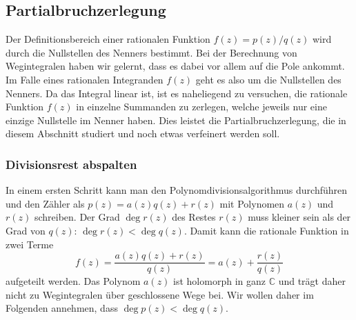 %
%
%
\subsection{Partialbruchzerlegung
\label{buch:ratint:bernoulli:subsection:partialbruch}}
Der Definitionsbereich einer rationalen Funktion $f(z)=p(z)/q(z)$
wird durch die Nullstellen des Nenners bestimmt.
Bei der Berechnung von Wegintegralen haben wir gelernt, dass es
dabei vor allem auf die Pole ankommt.
Im Falle eines rationalen Integranden $f(z)$ geht es also um die 
Nullstellen des Nenners.
Da das Integral linear ist, ist es naheliegend zu versuchen,
die rationale Funktion $f(z)$ in einzelne Summanden zu zerlegen,
welche jeweils nur eine einzige Nullstelle im Nenner haben.
Dies leistet die Partialbruchzerlegung, die in diesem Abschnitt
studiert und noch etwas verfeinert werden soll.

%
%
\subsubsection{Divisionsrest abspalten}
In einem ersten Schritt kann man den Polynomdivisionsalgorithmus
durchführen und den Zähler als $p(z) = a(z)q(z) + r(z)$ mit
Polynomen $a(z)$ und $r(z)$ schreiben.
%
Der Grad $\deg r(z)$ des Restes $r(z)$ muss kleiner sein als
der Grad von $q(z)$: $\deg r(z) <\deg q(z)$.
Damit kann die rationale Funktion in zwei Terme
\[
f(z)
=
\frac{a(z)q(z)+r(z)}{q(z)}
=
a(z)
+
\frac{r(z)}{q(z)}
\]
aufgeteilt werden.
Das Polynom $a(z)$ ist holomorph in ganz $\mathbb{C}$ und trägt
daher nicht zu Wegintegralen über geschlossene Wege bei.
Wir wollen daher im Folgenden annehmen, dass $\deg p(z)<\deg q(z)$.

%
%
